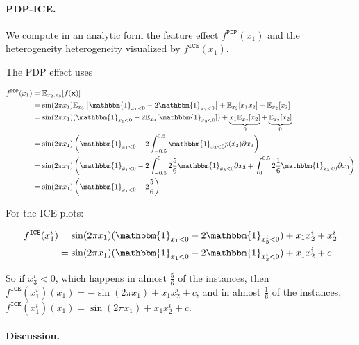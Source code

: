 \documentclass{article} %
\newcommand{\xb}{\mathbf{x}}
\begin{document}
\paragraph{PDP-ICE.} We compute in an analytic form the feature effect $f^{\mathtt{PDP}}(x_1)$ and the
heterogeneity heterogeneity visualized by $f^{\mathtt{ICE}}(x_1)$.

The PDP effect uses

\begin{align}
    \label{eq:toy-example-pdp-effect}
  f^{\mathtt{PDP}}(x_1) &= \mathbb{E}_{x_2, x_3}[f(\xb)] \\
  &= \sin(2 \pi x_1) \mathbb{E}_{x_3} \left [ \mathbbm{1}_{x_1 < 0} - 2\mathbbm{1}_{x_3 < 0} \right ] + \mathbb{E}_{x_2} [x_1 x_2] + \mathbb{E}_{x_2} [x_2] \\
  &= \sin(2 \pi x_1) (\mathbbm{1}_{x_1 < 0} - 2 \mathbb{E}_{x_3} [\mathbbm{1}_{x_3 < 0}]) + \underbrace{x_1 \mathbb{E}_{x_2} [x_2]}_{0} + \underbrace{\mathbb{E}_{x_2} [x_2]}_{0} \\
  &= \sin(2 \pi x_1) \left ( \mathbbm{1}_{x_1 < 0} - 2 \int_{-0.5}^{0.5} \mathbbm{1}_{x_3 < 0} p(x_3) \partial x_3 \right )\\
  &= \sin(2 \pi x_1) \left ( \mathbbm{1}_{x_1 < 0} - 2 \int_{-0.5}^{0} 2 \frac{5}{6} \mathbbm{1}_{x_3 < 0}  \partial x_3 + \int_{0}^{0.5} 2 \frac{1}{6} \mathbbm{1}_{x_3 < 0}  \partial x_3 \right ) \\
  &= \sin(2 \pi x_1) \left ( \mathbbm{1}_{x_1 < 0} - 2 \frac{5}{6} \right )
\end{align}

For the ICE plots:

\begin{align}
    \label{eq:toy-example-ice-effect}
  f^{\mathtt{ICE}}(x_1^i) &= \sin(2 \pi x_1) (\mathbbm{1}_{x_1 < 0} - 2\mathbbm{1}_{x_3^i < 0} ) + x_1 x_2^i + x_2^i \\
    &= \sin(2 \pi x_1) (\mathbbm{1}_{x_1 < 0} - 2\mathbbm{1}_{x_3^i < 0} ) + x_1 x_2^i + c
\end{align}

So if $x_3^i < 0$, which happens in almost $\frac{5}{6}$ of the instances, then $f^{\mathtt{ICE}}(x_1^i)(x_1) = - \sin(2 \pi x_1) + x_1 x_2^i + c$,
and in almost $\frac{1}{6}$ of the instances, $f^{\mathtt{ICE}}(x_1^i)(x_1) = \sin(2 \pi x_1) + x_1 x_2^i + c$.

\paragraph{Discussion.}
\end{document}

